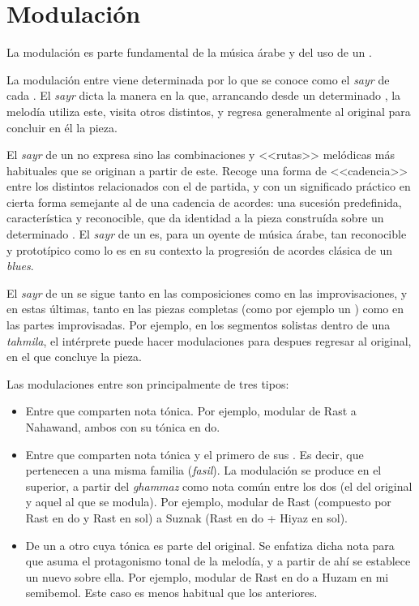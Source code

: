 \section{Modulación}
\label{modulacion}

La modulación es parte fundamental de la música árabe y del uso de un \maqamb.

La modulación entre \maqamaat viene determinada por lo que se conoce como el \emph{sayr} de cada \maqam. El \emph{sayr} dicta la manera en la que, arrancando desde un determinado \maqam, la melodía utiliza este, visita otros \maqamaat distintos, y regresa generalmente al original para concluir en él la pieza.

El \emph{sayr} de un \maqam no expresa sino las combinaciones y <<rutas>> melódicas más habituales que se originan a partir de este. Recoge una forma de <<cadencia>> entre los distintos \maqamaat relacionados con el de partida, y con un significado práctico en cierta forma semejante al de una cadencia de acordes: una sucesión predefinida, característica y reconocible, que da identidad a la pieza construída sobre un determinado \maqamb. El \emph{sayr} de un \maqam es, para un oyente de música árabe, tan reconocible y prototípico como lo es en su contexto la progresión de acordes clásica de un \emph{blues}.

El \emph{sayr} de un \maqam se sigue tanto en las composiciones como en las improvisaciones, y en estas últimas, tanto en las piezas completas (como por ejemplo un \taqsimb) como en las partes improvisadas. Por ejemplo, en los segmentos solistas dentro de una \emph{tahmila}, el intérprete puede hacer modulaciones para despues regresar al \maqam original, en el que concluye la pieza.

Las modulaciones entre \maqamaat son principalmente de tres tipos:

\begin{itemize}
\item Entre \maqamaat que comparten nota tónica. Por ejemplo, modular de Rast a Nahawand, ambos con su tónica en do.
\item Entre \maqamaat que comparten nota tónica y el primero de sus \yinsb. Es decir, que pertenecen a una misma familia (\emph{fasil}). La modulación se produce en el \yins superior, a partir del \emph{ghammaz} como nota común entre los dos \ashnas (el del \maqam original y aquel al que se modula). Por ejemplo, modular de Rast (compuesto por \yins Rast en do y \yins Rast en sol) a \maqam Suznak (Rast en do + Hiyaz en sol).
\item De un \maqam a otro cuya tónica es parte del \maqam original. Se enfatiza dicha nota para que asuma el protagonismo tonal de la melodía, y a partir de ahí se establece un nuevo \maqam sobre ella. Por ejemplo, modular de Rast en do a Huzam en mi semibemol. Este caso es menos habitual que los anteriores.
\end{itemize}

